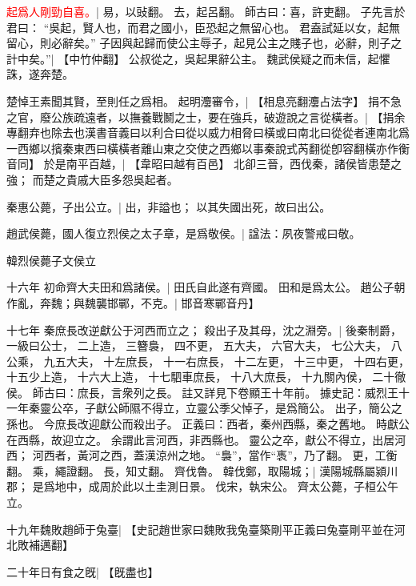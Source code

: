 \textcolor{red}{起爲人剛勁自喜。}|{
	易，以䜴翻。
	去，起呂翻。
	師古曰：喜，許吏翻。
	}
子先言於君曰：
“吳起，賢人也，而君之國小，臣恐起之無留心也。
君盍試延以女，起無留心，則必辭矣。”
子因與起歸而使公主辱子，起見公主之賤子也，必辭，則子之計中矣。”|{
	【中竹仲翻】}
公叔從之，吳起果辭公主。
魏武侯疑之而未信，起懼誅，遂奔楚。


楚悼王素聞其賢，至則任之爲相。%
起明灋審令，|{
	【相息亮翻灋占法字】}
捐不急之官，廢公族疏遠者，以撫養戰鬭之士，要在強兵，破遊說之言從橫者。|{
	【捐余專翻弃也除去也漢書音義曰以利合曰從以威力相脅曰橫或曰南北曰從從者連南北爲一西鄉以擯秦東西曰橫橫者離山東之交使之西鄉以事秦說式芮翻從卽容翻橫亦作衡音同】}
於是南平百越，|{
	【韋昭曰越有百邑】}
北卻三晉，西伐秦，諸侯皆患楚之強；
而楚之貴戚大臣多怨吳起者。

秦惠公薨，子出公立。|{
	出，非謚也；
	以其失國出死，故曰出公。
	}

趙武侯薨，國人復立烈侯之太子章，是爲敬侯。|{
	諡法：夙夜警戒曰敬。
	}

韓烈侯薨子文侯立


十六年
初命齊大夫田和爲諸侯。|{
	田氏自此遂有齊國。
	田和是爲太公。
	}
趙公子朝作亂，奔魏；與魏襲邯鄲，不克。|{
	邯音寒鄲音丹】}
\par
十七年
秦庶長改逆獻公于河西而立之；
殺出子及其母，沈之淵旁。|{
	後秦制爵，
	一級曰公士，
	二上造，
	三簪裊，
	四不更，
	五大夫，
	六官大夫，
	七公大夫，
	八公乘，
	九五大夫，
	十左庶長，
	十一右庶長，
	十二左更，
	十三中更，
	十四右更，
	十五少上造，
	十六大上造，
	十七駟車庶長，
	十八大庶長，
	十九關內侯，
	二十徹侯。
	師古曰：庶長，言衆列之長。
	註又詳見下卷顯王十年前。
	據史記：威烈王十一年秦靈公卒，子獻公師隰不得立，立靈公季父悼子，是爲簡公。
	出子，簡公之孫也。
	今庶長改迎獻公而殺出子。
	正義曰：西者，秦州西縣，秦之舊地。
	時獻公在西縣，故迎立之。
	余謂此言河西，非西縣也。
	靈公之卒，獻公不得立，出居河西；
	河西者，黃河之西，蓋漢涼州之地。
	“裊”，當作“褭”，乃了翻。
	更，工衡翻。
	乘，繩證翻。
	長，知丈翻。
	}
齊伐魯。
韓伐鄭，取陽城；|{
	漢陽城縣屬潁川郡；
	是爲地中，成周於此以土圭測日景。
	}
伐宋，執宋公。
齊太公薨，子桓公午立。


十九年魏敗趙師于兔臺|{
	【史記趙世家曰魏敗我兔臺築剛平正義曰兔臺剛平並在河北敗補邁翻】}
\par
二十年日有食之旣|{
	【旣盡也】}
\par



